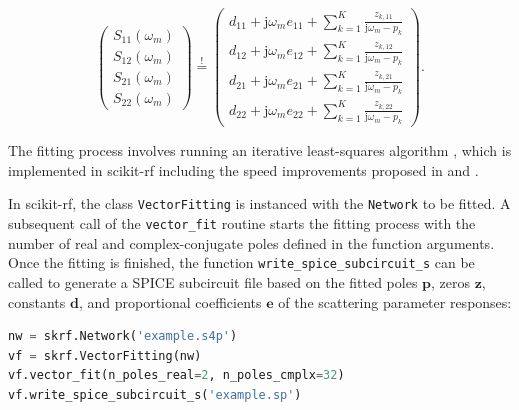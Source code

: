 \documentclass[10pt, letterpaper]{scrartcl}
\newcommand{\skrf}{{s}cikit-rf\xspace}
\begin{document}
\begin{equation}
\begin{pmatrix}
S_{11} (\omega_m) \\
S_{12} (\omega_m) \\
S_{21} (\omega_m) \\
S_{22} (\omega_m)
\end{pmatrix} 
\overset{!}{=}
\begin{pmatrix}
d_{11} + \mathrm{j} \omega_m e_{11} + \sum _{k=1} ^{K} \frac{z_{k,11}}{\mathrm{j} \omega_m - p_k} \\
d_{12} + \mathrm{j} \omega_m e_{12} + \sum _{k=1} ^{K} \frac{z_{k,12}}{\mathrm{j} \omega_m - p_k} \\
d_{21} + \mathrm{j} \omega_m e_{21} + \sum _{k=1} ^{K} \frac{z_{k,21}}{\mathrm{j} \omega_m - p_k} \\
d_{22} + \mathrm{j} \omega_m e_{22} + \sum _{k=1} ^{K} \frac{z_{k,22}}{\mathrm{j} \omega_m - p_k}
\end{pmatrix} .
\end{equation}

The fitting process involves running an iterative least-squares algorithm \cite{vectfit}, which is implemented in \skrf{} including the speed improvements proposed in \cite{vectfit_improved} and \cite{vectfit_fast}.

In \skrf{}, the class \texttt{VectorFitting} is instanced with the \texttt{Network} to be fitted. A subsequent call of the \texttt{vector\_fit} routine starts the fitting process with the number of real and complex-conjugate poles defined in the function arguments. Once the fitting is finished, the function \texttt{write\_spice\_subcircuit\_s} can be called to generate a SPICE subcircuit file based on the fitted poles $\mathbf{p}$, zeros $\mathbf{z}$, constants $\mathbf{d}$, and proportional coefficients $\mathbf{e}$ of the scattering parameter responses:

\begin{lstlisting}[language=Python]
nw = skrf.Network('example.s4p')
vf = skrf.VectorFitting(nw)
vf.vector_fit(n_poles_real=2, n_poles_cmplx=32)
vf.write_spice_subcircuit_s('example.sp')
\end{lstlisting}
\end{document}

